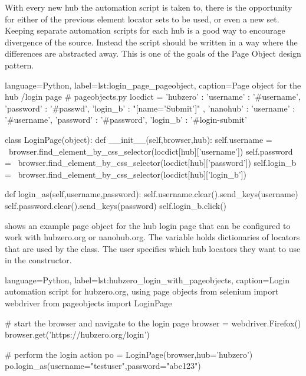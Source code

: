 With every new hub the automation script is taken to, there is the opportunity
for either of the previous element locator sets to be used, or even a new set.
Keeping separate automation scripts for each hub is a good way to encourage
divergence of the source. Instead the script should be written in a way where
the differences are abstracted away. This is one of the goals of the Page
Object design pattern.

\begin{xcode}{%
  language=Python,%
  label=lst:login_page_pageobject,%
  caption={Page object for the hub /login page}%
}
# pageobjects.py
locdict = {
  'hubzero' : {
    'username' : '#username',
    'password' : '#passwd',
    'login_b'  : "[name='Submit']"
  },
  'nanohub' : {
    'username' : '#username',
    'password' : '#password',
    'login_b'  : '#login-submit'
  }
}

class LoginPage(object):
    def __init__(self,browser,hub):
        self.username = \
            browser.find_element_by_css_selector(locdict[hub]['username'])
        self.password = \
            browser.find_element_by_css_selector(locdict[hub]['password'])
        self.login_b = \
            browser.find_element_by_css_selector(locdict[hub]['login_b'])

    def login_as(self,username,password):
        self.username.clear().send_keys(username)
        self.password.clear().send_keys(password)
        self.login_b.click()
\end{xcode}

 shows an example page object for the
hub login page that can be configured to work with hubzero.org or nanohub.org.
The  variable holds dictionaries of locators that are used by
the \xfclass{LoginPage} class. The user specifies which hub locators they want
to use in the \xfclass{LoginPage} constructor.


\begin{xcode}{%
  language=Python,%
  label=lst:hubzero_login_with_pageobjects,%
  caption={Login automation script for hubzero.org, using page objects}%
}
from selenium import webdriver
from pageobjects import LoginPage

# start the browser and navigate to the login page
browser = webdriver.Firefox()
browser.get('https://hubzero.org/login')

# perform the login action
po = LoginPage(browser,hub='hubzero')
po.login_as(username="testuser",password="abc123")
\end{xcode}


